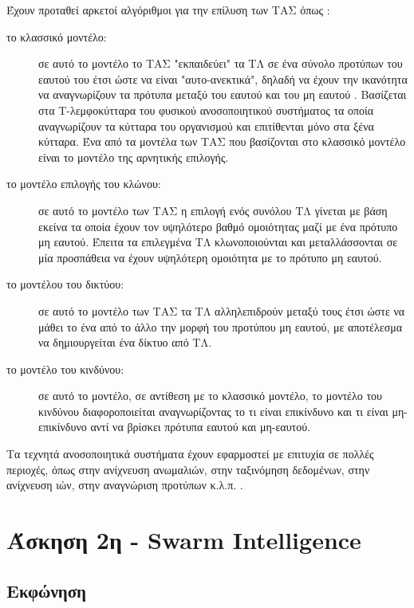 \documentclass{assignment}
\begin{document}
Έχουν προταθεί αρκετοί αλγόριθμοι για την επίλυση των ΤΑΣ όπως \cite{engelbrecht}:
\begin{description}

\item[το κλασσικό μοντέλο:] σε αυτό το μοντέλο το ΤΑΣ "εκπαιδεύει" τα ΤΛ σε ένα σύνολο προτύπων του εαυτού του έτσι ώστε να είναι "αυτο-ανεκτικά", δηλαδή να έχουν την ικανότητα να αναγνωρίζουν τα πρότυπα μεταξύ του εαυτού και του μη εαυτού \cite{engelbrecht}. Βασίζεται στα Τ-λεμφοκύτταρα του φυσικού ανοσοποιητικού συστήματος τα οποία αναγνωρίζουν τα κύτταρα του οργανισμού και επιτίθενται μόνο στα ξένα κύτταρα. Ένα από τα μοντέλα των ΤΑΣ που βασίζονται στο κλασσικό μοντέλο είναι το μοντέλο της αρνητικής επιλογής.

\item[το μοντέλο επιλογής του κλώνου:]  σε αυτό το μοντέλο των ΤΑΣ η επιλογή ενός συνόλου ΤΛ γίνεται με βάση εκείνα τα οποία έχουν τον υψηλότερο βαθμό ομοιότητας μαζί με ένα πρότυπο μη εαυτού. Έπειτα τα επιλεγμένα ΤΛ κλωνοποιούνται και μεταλλάσσονται σε μία προσπάθεια να έχουν υψηλότερη ομοιότητα με το πρότυπο μη εαυτού.

\item[το μοντέλου του δικτύου:] σε αυτό το μοντέλο των ΤΑΣ τα ΤΛ αλληλεπιδρούν μεταξύ τους έτσι ώστε να μάθει το ένα από το άλλο την μορφή του προτύπου μη εαυτού, με αποτέλεσμα να δημιουργείται ένα δίκτυο από ΤΛ.

\item[το μοντέλο του κινδύνου:] σε αυτό το μοντέλο, σε αντίθεση με το κλασσικό μοντέλο, το μοντέλο του κινδύνου διαφοροποιείται αναγνωρίζοντας το τι είναι επικίνδυνο και τι είναι μη-επικίνδυνο αντί να βρίσκει πρότυπα εαυτού και μη-εαυτού.

\end{description}

Τα τεχνητά ανοσοποιητικά συστήματα έχουν εφαρμοστεί με επιτυχία σε πολλές περιοχές, όπως στην ανίχνευση ανωμαλιών, στην ταξινόμηση δεδομένων, στην ανίχνευση ιών, στην αναγνώριση προτύπων κ.λ.π. \cite{wiki:artificial_immune_system, engelbrecht, karakasis_thesis}.

\section{Άσκηση 2η - Swarm Intelligence}
\subsection{Εκφώνηση}
\end{document}
